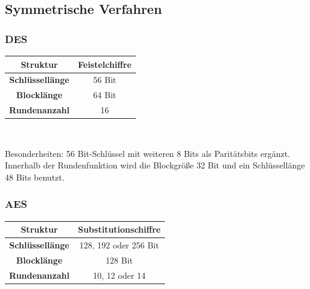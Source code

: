 \documentclass[8pt,a4paper,landscape]{article}
\begin{document}
\begin{multicols}{4}
\subsection{Symmetrische Verfahren}

\subsubsection{DES}
\begin{center}
\begin{tabular}{|c|c|}
\hline \textbf{Struktur} & Feistelchiffre \\ 
\hline \textbf{Schlüssellänge} & 56 Bit \\ 
\hline \textbf{Blocklänge} & 64 Bit \\ 
\hline \textbf{Rundenanzahl} & 16 \\ 
\hline 
\end{tabular} \\[0.5cm]
\end{center}
Besonderheiten: 56 Bit-Schlüssel mit weiteren 8 Bits als Paritätsbits ergänzt. Innerhalb der Rundenfunktion wird die Blockgröße 32 Bit und ein Schlüssellänge 48 Bits benutzt.

\subsubsection{AES}
\begin{center}
\begin{tabular}{|c|c|}
\hline \textbf{Struktur} & Substitutionschiffre \\ 
\hline \textbf{Schlüssellänge} & 128, 192 oder 256 Bit\\ 
\hline \textbf{Blocklänge} & 128 Bit \\ 
\hline \textbf{Rundenanzahl} & 10, 12 oder 14\\ 
\hline 
\end{tabular} 
\end{center}

\end{multicols}
\end{document}
